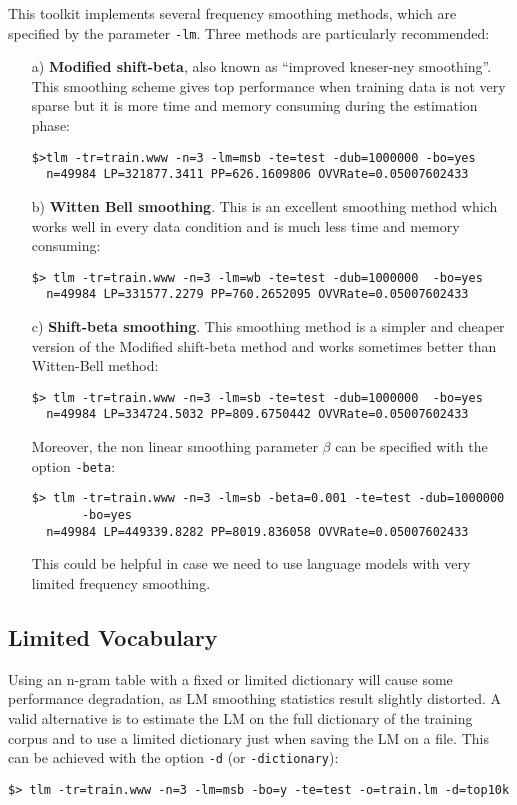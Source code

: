 \documentclass[11pt]{article}
\begin{document}
\noindent
This toolkit implements several frequency smoothing methods, which are
specified  by  the  parameter  {\tt -lm}.  Three  methods  are  particularly
recommended:
\begin{itemize}
\item [a)] {\bf Modified shift-beta}, also known as  ``improved kneser-ney smoothing''.  
This smoothing scheme gives top performance when training data is not 
very sparse but it is more time and memory consuming during the estimation phase: 

\begin{verbatim}
$>tlm -tr=train.www -n=3 -lm=msb -te=test -dub=1000000 -bo=yes
  n=49984 LP=321877.3411 PP=626.1609806 OVVRate=0.05007602433
\end{verbatim}


\item [b)] {\bf Witten Bell smoothing}. This is an excellent smoothing
   method which works well in every data condition and is much less time and memory consuming:

\begin{verbatim}
$> tlm -tr=train.www -n=3 -lm=wb -te=test -dub=1000000  -bo=yes
  n=49984 LP=331577.2279 PP=760.2652095 OVVRate=0.05007602433
\end{verbatim}

\item [c)] {\bf Shift-beta smoothing}. This smoothing method is a simpler and cheaper version
of the Modified shift-beta method and works sometimes better than Witten-Bell method: 

\begin{verbatim}
$> tlm -tr=train.www -n=3 -lm=sb -te=test -dub=1000000  -bo=yes
  n=49984 LP=334724.5032 PP=809.6750442 OVVRate=0.05007602433
\end{verbatim}

\noindent
Moreover, the non linear smoothing parameter $\beta$ can be specified with the option {\tt -beta}:
\begin{verbatim}
$> tlm -tr=train.www -n=3 -lm=sb -beta=0.001 -te=test -dub=1000000  
       -bo=yes
  n=49984 LP=449339.8282 PP=8019.836058 OVVRate=0.05007602433
\end{verbatim}
This could be helpful in case we need to use language models with very limited frequency smoothing.

\end{itemize}
\subsection*{Limited Vocabulary}
\noindent
Using an  n-gram table  with a fixed  or limited  dictionary  will cause
some performance  degradation, as LM smoothing  statistics result
slightly distorted. A  valid alternative is to estimate  the LM on the
full dictionary of the training corpus and to use a limited dictionary
just when  saving the  LM on a  file.  This  can be achieved  with the
option {\tt -d} (or {\tt -dictionary}):
\begin{verbatim}
$> tlm -tr=train.www -n=3 -lm=msb -bo=y -te=test -o=train.lm -d=top10k
\end{verbatim}
\end{document}
